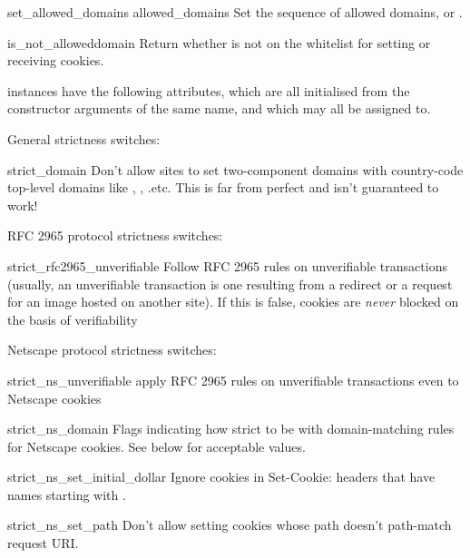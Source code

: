 \begin{methoddesc}[DefaultCookiePolicy]{set_allowed_domains}
  {allowed_domains}
Set the sequence of allowed domains, or .
\end{methoddesc}

\begin{methoddesc}[DefaultCookiePolicy]{is_not_allowed}{domain}
Return whether  is not on the whitelist for setting or
receiving cookies.
\end{methoddesc}

 instances have the following attributes,
which are all initialised from the constructor arguments of the same
name, and which may all be assigned to.

General strictness switches:

\begin{memberdesc}{strict_domain}
Don't allow sites to set two-component domains with country-code
top-level domains like , ,
.etc.  This is far from perfect and isn't guaranteed to
work!
\end{memberdesc}

RFC 2965 protocol strictness switches:

\begin{memberdesc}{strict_rfc2965_unverifiable}
Follow RFC 2965 rules on unverifiable transactions (usually, an
unverifiable transaction is one resulting from a redirect or a request
for an image hosted on another site).  If this is false, cookies are
\emph{never} blocked on the basis of verifiability
\end{memberdesc}

Netscape protocol strictness switches:

\begin{memberdesc}{strict_ns_unverifiable}
apply RFC 2965 rules on unverifiable transactions even to Netscape
cookies
\end{memberdesc}
\begin{memberdesc}{strict_ns_domain}
Flags indicating how strict to be with domain-matching rules for
Netscape cookies.  See below for acceptable values.
\end{memberdesc}
\begin{memberdesc}{strict_ns_set_initial_dollar}
Ignore cookies in Set-Cookie: headers that have names starting with
.
\end{memberdesc}
\begin{memberdesc}{strict_ns_set_path}
Don't allow setting cookies whose path doesn't path-match request URI.
\end{memberdesc}

